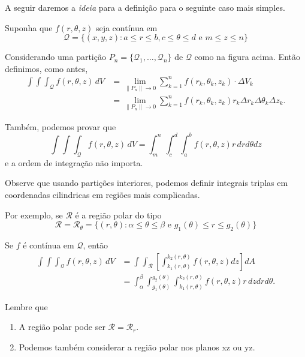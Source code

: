 A seguir daremos a \textit{ideia} para a definição para o seguinte caso mais simples.

Suponha que \(f(r,\theta,z)\) seja contínua em \[\mathcal{Q} = \{(x,y,z) : a\leq r\leq b, c\leq\theta\leq d \text{ e } m\leq z\leq n\}\]

Considerando uma partição \(P_n = \{\mathcal{Q}_1,\dots,\mathcal{Q}_n\}\) de \(\mathcal{Q}\) como na figura acima. Então definimos, como antes,
    \begin{align*}
        \int\int\int_\mathcal{Q} f(r,\theta,z)\, dV
            & = \lim_{\|P_n\|\to 0} \sum_{k=1}^n f(r_k,\theta_k,z_k)\cdot\Delta V_k \\
            & = \lim_{\|P_n\|\to 0} \sum_{k=1}^n f(r_k,\theta_k,z_k) r_k \Delta r_k \Delta \theta_k \Delta z_k.
    \end{align*}

Também, podemos provar que
    \[\int\int\int_\mathcal{Q} f(r,\theta,z)\, dV = \int_m^n \int_c^d \int_a^b f(r,\theta,z) r\, drd\theta dz\] 
e a ordem de integração não importa.

Observe que usando partições interiores, podemos definir integrais triplas em coordenadas cilindricas em regiões mais complicadas.

Por exemplo, se \(\mathcal{R}\) é a região polar do tipo \[\mathcal{R} = \mathcal{R}_\theta = \{(r,\theta) : \alpha \leq \theta \leq \beta \text{ e } g_1(\theta)\leq r \leq g_2(\theta)\}\] %
\begin{theorem}
    Se \(f\) é contínua em \(\mathcal{Q}\), então
        \begin{align*}
            \int\int\int_\mathcal{Q} f(r,\theta,z)\, dV
                & = \int\int_\mathcal{R}\left[ \int_{k_1(r,\theta)}^{k_2(r,\theta)} f(r,\theta,z) dz \right] dA \\
                & = \int_\alpha^\beta \int_{g_1(\theta)}^{g_2(\theta)} \int_{k_1(r,\theta)}^{k_2(r,\theta)} f(r,\theta,z) r\, dz dr d\theta.
        \end{align*}
\end{theorem}

Lembre que
    \begin{enumerate}
        \item A região polar pode ser \(\mathcal{R} = \mathcal{R}_r\).
        \item Podemos também considerar a região polar nos planos xz ou yz.
    \end{enumerate}

